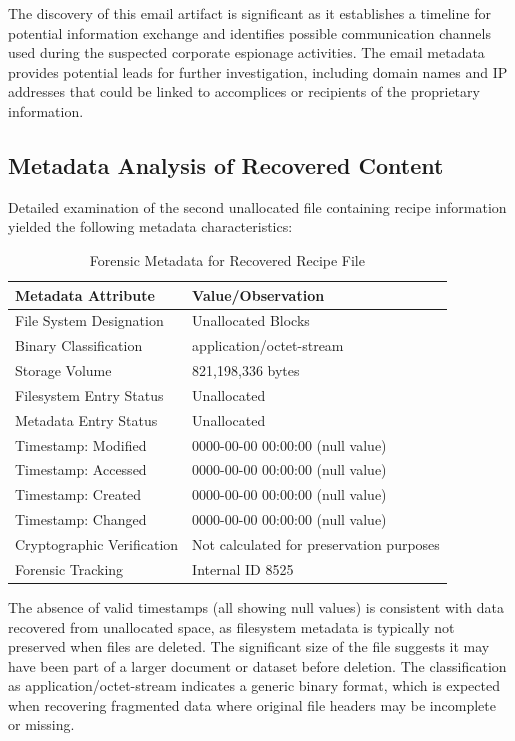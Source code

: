 The discovery of this email artifact is significant as it establishes a timeline for potential information exchange and identifies possible communication channels used during the suspected corporate espionage activities. The email metadata provides potential leads for further investigation, including domain names and IP addresses that could be linked to accomplices or recipients of the proprietary information.

\subsection{Metadata Analysis of Recovered Content}
Detailed examination of the second unallocated file containing recipe information yielded the following metadata characteristics:

\begin{table}[htbp]
\centering
\begin{tabular}{|p{4cm}|p{8cm}|}
\hline
\textbf{Metadata Attribute} & \textbf{Value/Observation} \\
\hline
File System Designation & Unallocated Blocks \\
\hline
Binary Classification & application/octet-stream \\
\hline
Storage Volume & 821,198,336 bytes \\
\hline
Filesystem Entry Status & Unallocated \\
\hline
Metadata Entry Status & Unallocated \\
\hline
Timestamp: Modified & 0000-00-00 00:00:00 (null value) \\
\hline
Timestamp: Accessed & 0000-00-00 00:00:00 (null value) \\
\hline
Timestamp: Created & 0000-00-00 00:00:00 (null value) \\
\hline
Timestamp: Changed & 0000-00-00 00:00:00 (null value) \\
\hline
Cryptographic Verification & Not calculated for preservation purposes \\
\hline
Forensic Tracking & Internal ID 8525 \\
\hline
\end{tabular}
\caption{Forensic Metadata for Recovered Recipe File}
\label{table:recovered_file_metadata}
\end{table}

The absence of valid timestamps (all showing null values) is consistent with data recovered from unallocated space, as filesystem metadata is typically not preserved when files are deleted. The significant size of the file suggests it may have been part of a larger document or dataset before deletion. The classification as application/octet-stream indicates a generic binary format, which is expected when recovering fragmented data where original file headers may be incomplete or missing.

